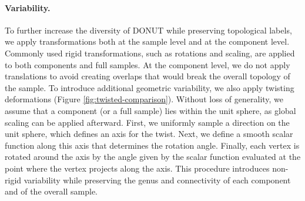 \paragraph{Variability.} 
To further increase the diversity of DONUT while preserving topological labels, we apply transformations both at the sample level and at the component level. Commonly used rigid transformations, such as rotations and scaling, are applied to both components and full samples. At the component level, we do not apply translations to avoid creating overlaps that would break the overall topology of the sample. To introduce additional geometric variability, we also apply twisting deformations (Figure \ref{fig:twisted-comparison}). Without loss of generality, we assume that a component (or a full sample) lies within the unit sphere, as global scaling can be applied afterward. First, we uniformly sample a direction on the unit sphere, which defines an axis for the twist. Next, we define a smooth scalar function along this axis that determines the rotation angle. Finally, each vertex is rotated around the axis by the angle given by the scalar function evaluated at the point where the vertex projects along the axis. This procedure introduces non-rigid variability while preserving the genus and connectivity of each component and of the overall sample.

